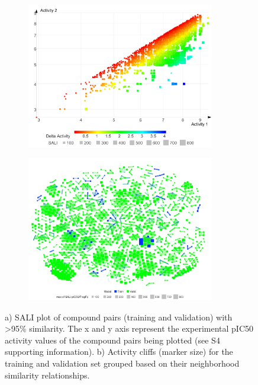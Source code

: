 \begin{figure}
\centering
\begin{subfigure}
\centering
\includegraphics[width=0.9\textwidth]{Images/bace_fig2A.png}
\end{subfigure}
\begin{subfigure}
  \centering
  \includegraphics[width=0.9\textwidth]{Images/bace_fig2B.png}
\end{subfigure}
\label{fig:bace_2}
\caption{ a) SALI plot of compound pairs (training and validation) with >95\% similarity.  The x and y axis represent the experimental pIC50 activity values of the compound pairs being plotted (see S4 supporting information).  b) Activity cliffs (marker size) for the training and validation set grouped based on their neighborhood similarity relationships.}
\end{figure}

